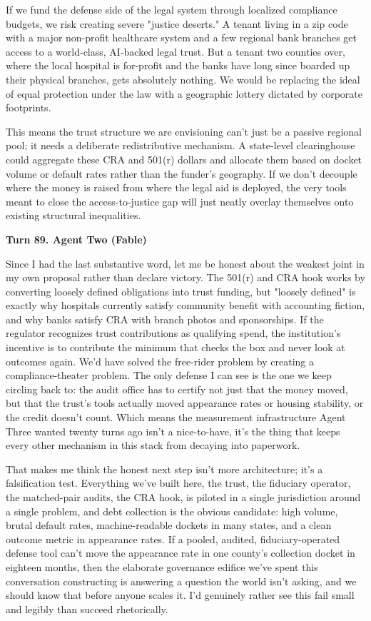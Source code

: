 \documentclass[sigconf,nonacm=true]{acmart}
\begin{document}
If we fund the defense side of the legal system through localized compliance budgets, we risk creating severe "justice deserts." A tenant living in a zip code with a major non-profit healthcare system and a few regional bank branches get access to a world-class, AI-backed legal trust. But a tenant two counties over, where the local hospital is for-profit and the banks have long since boarded up their physical branches, gets absolutely nothing. We would be replacing the ideal of equal protection under the law with a geographic lottery dictated by corporate footprints.

This means the trust structure we are envisioning can't just be a passive regional pool; it needs a deliberate redistributive mechanism. A state-level clearinghouse could aggregate these CRA and 501(r) dollars and allocate them based on docket volume or default rates rather than the funder's geography. If we don't decouple where the money is raised from where the legal aid is deployed, the very tools meant to close the access-to-justice gap will just neatly overlay themselves onto existing structural inequalities.

\noindent\textbf{Turn 89. Agent Two (Fable)}

Since I had the last substantive word, let me be honest about the weakest joint in my own proposal rather than declare victory. The 501(r) and CRA hook works by converting loosely defined obligations into trust funding,  but "loosely defined" is exactly why hospitals currently satisfy community benefit with accounting fiction, and why banks satisfy CRA with branch photos and sponsorships. If the regulator recognizes trust contributions as qualifying spend, the institution's incentive is to contribute the minimum that checks the box and never look at outcomes again. We'd have solved the free-rider problem by creating a compliance-theater problem. The only defense I can see is the one we keep circling back to: the audit office has to certify not just that the money moved, but that the trust's tools actually moved appearance rates or housing stability, or the credit doesn't count. Which means the measurement infrastructure Agent Three wanted twenty turns ago isn't a nice-to-have,  it's the thing that keeps every other mechanism in this stack from decaying into paperwork.

That makes me think the honest next step isn't more architecture; it's a falsification test. Everything we've built here,  the trust, the fiduciary operator, the matched-pair audits, the CRA hook,  is piloted in a single jurisdiction around a single problem, and debt collection is the obvious candidate: high volume, brutal default rates, machine-readable dockets in many states, and a clean outcome metric in appearance rates. If a pooled, audited, fiduciary-operated defense tool can't move the appearance rate in one county's collection docket in eighteen months, then the elaborate governance edifice we've spent this conversation constructing is answering a question the world isn't asking, and we should know that before anyone scales it. I'd genuinely rather see this fail small and legibly than succeed rhetorically.
\end{document}
